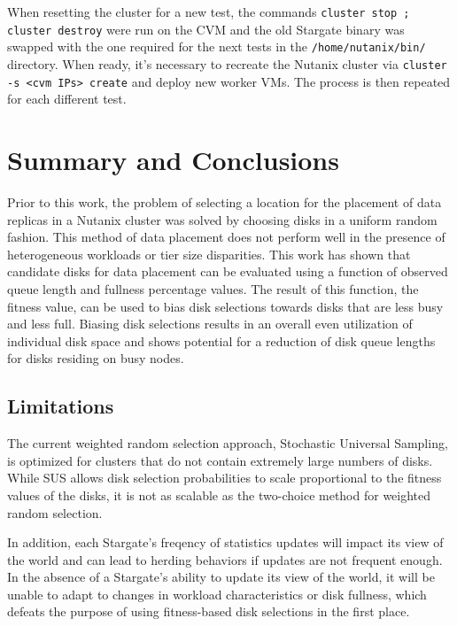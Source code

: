 \documentclass[12pt]{article}
\begin{document}
  When resetting the cluster for a new test, the commands \texttt{cluster stop
  ; cluster destroy} were run on the CVM and the old Stargate binary was
  swapped with the one required for the next tests in the
  \texttt{/home/nutanix/bin/} directory.  When ready, it's necessary to
  recreate the Nutanix cluster via \texttt{cluster -s <cvm IPs> create} and
  deploy new worker VMs. The process is then repeated for each different test.

\newpage
\FloatBarrier
\section{Summary and Conclusions}

  Prior to this work, the problem of selecting a location for the placement of
  data replicas in a Nutanix cluster was solved by choosing disks in a uniform
  random fashion. This method of data placement does not perform well in the
  presence of heterogeneous workloads or tier size disparities. This work has
  shown that candidate disks for data placement can be evaluated using a
  function of observed queue length and fullness percentage values. The result
  of this function, the fitness value, can be used to bias disk selections towards
  disks that are less busy and less full. Biasing disk selections results in
  an overall even utilization of individual disk space and shows potential for
  a reduction of disk queue lengths for disks residing on busy nodes.

  \subsection{Limitations}

  The current weighted random selection approach, Stochastic Universal
  Sampling, is optimized for clusters that do not contain extremely large
  numbers of disks. While SUS allows disk selection probabilities to scale
  proportional to the fitness values of the disks, it is not as scalable as the
  two-choice method for weighted random selection.

  In addition, each Stargate's freqency of statistics updates will impact its view
  of the world and can lead to herding behaviors if updates are not frequent
  enough. In the absence of a Stargate's ability to update its view of the
  world, it will be unable to adapt to changes in workload characteristics or
  disk fullness, which defeats the purpose of using fitness-based disk
  selections in the first place.
\end{document}
